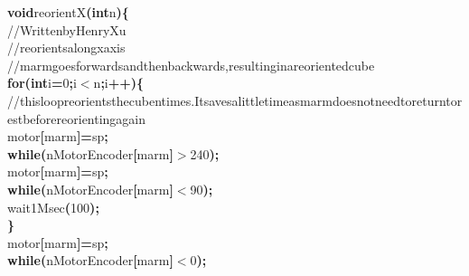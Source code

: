\documentclass[a4paper, 10pt]{article}
\newcommand\SPC{\hspace*{0.6em}}
\newcommand\TAB{\hspace*{1.2em}}
\newcommand\HYP{\mbox{\char 45}}
\newcommand{\CppAComment}[1]{\textcolor[rgb]{0,0.5,0}{\colorbox[rgb]{1,1,1}{#1}}}
\newcommand{\CppAIdentifier}[1]{#1}
\newcommand{\CppANumber}[1]{\textcolor[rgb]{0,0,1}{\colorbox[rgb]{1,1,1}{#1}}}
\newcommand{\CppAReservedWord}[1]{\textbf{\colorbox[rgb]{1,1,1}{#1}}}
\newcommand{\CppASpace}[1]{\colorbox[rgb]{1,1,1}{#1}}
\newcommand{\CppASymbol}[1]{\textbf{\textcolor[rgb]{1,0,0}{\colorbox[rgb]{1,1,1}{#1}}}}
\begin{document}
\begin{ttfamily}
\CppAReservedWord{void}\CppASpace{\SPC }\CppAIdentifier{reorientX}\CppASymbol{(}\CppAReservedWord{int}\CppASpace{\SPC }\CppAIdentifier{n}\CppASymbol{)}\CppASymbol{\{}\\
\CppASpace{\TAB }\CppAComment{//\SPC Written\SPC by\SPC Henry\SPC Xu}\\
\CppASpace{\TAB }\CppAComment{//\SPC reorients\SPC along\SPC x\HYP axis}\\
\CppASpace{\TAB }\CppAComment{//\SPC marm\SPC goes\SPC forwards\SPC and\SPC then\SPC backwards,\SPC resulting\SPC in\SPC a\SPC reoriented\SPC cube}\\
\CppASpace{\TAB }\CppAReservedWord{for}\CppASymbol{(}\CppAReservedWord{int}\CppASpace{\SPC }\CppAIdentifier{i}\CppASymbol{=}\CppANumber{0}\CppASymbol{;}\CppAIdentifier{i}\CppASymbol{$<$}\CppAIdentifier{n}\CppASymbol{;}\CppAIdentifier{i}\CppASymbol{++}\CppASymbol{)}\CppASymbol{\{}\\
\CppASpace{\TAB \TAB }\CppAComment{//\SPC this\SPC loop\SPC reorients\SPC the\SPC cube\SPC n\SPC times.\SPC It\SPC saves\SPC a\SPC little\SPC time\SPC as\SPC marm\SPC does\SPC not\SPC need\SPC to\SPC return\SPC to\SPC rest\SPC before\SPC reorienting\SPC again}\\
\CppASpace{\TAB \TAB }\CppAIdentifier{motor}\CppASymbol{[}\CppAIdentifier{marm}\CppASymbol{]}\CppASymbol{=}\CppASymbol{\HYP }\CppAIdentifier{sp}\CppASymbol{;}\\
\CppASpace{\TAB \TAB }\CppAReservedWord{while}\CppASymbol{(}\CppAIdentifier{nMotorEncoder}\CppASymbol{[}\CppAIdentifier{marm}\CppASymbol{]}\CppASymbol{$>$}\CppASymbol{\HYP }\CppANumber{240}\CppASymbol{)}\CppASymbol{;}\\
\CppASpace{\TAB \TAB }\CppAIdentifier{motor}\CppASymbol{[}\CppAIdentifier{marm}\CppASymbol{]}\CppASymbol{=}\CppAIdentifier{sp}\CppASymbol{;}\\
\CppASpace{\TAB \TAB }\CppAReservedWord{while}\CppASpace{\SPC }\CppASymbol{(}\CppAIdentifier{nMotorEncoder}\CppASymbol{[}\CppAIdentifier{marm}\CppASymbol{]}\CppASymbol{$<$}\CppASymbol{\HYP }\CppANumber{90}\CppASymbol{)}\CppASymbol{;}\\
\CppASpace{\TAB \TAB }\CppAIdentifier{wait1Msec}\CppASymbol{(}\CppANumber{100}\CppASymbol{)}\CppASymbol{;}\\
\CppASpace{\TAB }\CppASymbol{\}}\\
\CppASpace{\TAB }\CppAIdentifier{motor}\CppASymbol{[}\CppAIdentifier{marm}\CppASymbol{]}\CppASymbol{=}\CppAIdentifier{sp}\CppASymbol{;}\\
\CppASpace{\TAB }\CppAReservedWord{while}\CppASpace{\SPC }\CppASymbol{(}\CppAIdentifier{nMotorEncoder}\CppASymbol{[}\CppAIdentifier{marm}\CppASymbol{]}\CppASymbol{$<$}\CppANumber{0}\CppASymbol{)}\CppASymbol{;}\\

\end{ttfamily}
\end{document}

